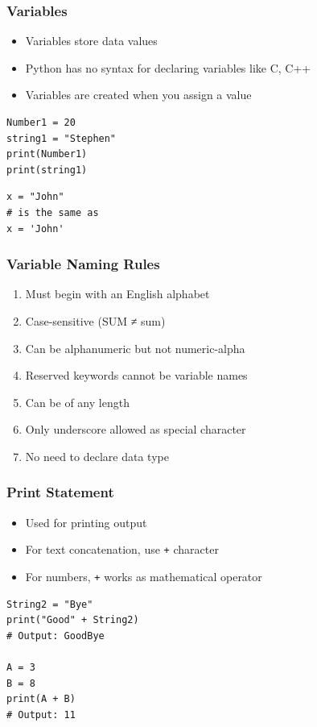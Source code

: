 \documentclass[aspectratio=169]{beamer}
\begin{document}
\begin{frame}[fragile]
\frametitle{Variables}
\begin{itemize}
\item Variables store data values
\item Python has no syntax for declaring variables like C, C++
\item Variables are created when you assign a value
\end{itemize}

\begin{lstlisting}
Number1 = 20
string1 = "Stephen"
print(Number1)
print(string1)
\end{lstlisting}

\begin{lstlisting}
x = "John"
# is the same as
x = 'John'
\end{lstlisting}
\end{frame}

\begin{frame}
\frametitle{Variable Naming Rules}
\begin{enumerate}
\item Must begin with an English alphabet
\item Case-sensitive (SUM ≠ sum)
\item Can be alphanumeric but not numeric-alpha
\item Reserved keywords cannot be variable names
\item Can be of any length
\item Only underscore allowed as special character
\item No need to declare data type
\end{enumerate}
\end{frame}

\begin{frame}[fragile]
\frametitle{Print Statement}
\begin{itemize}
\item Used for printing output
\item For text concatenation, use \texttt{+} character
\item For numbers, \texttt{+} works as mathematical operator
\end{itemize}

\begin{lstlisting}
String2 = "Bye"
print("Good" + String2)
# Output: GoodBye

A = 3
B = 8
print(A + B)
# Output: 11
\end{lstlisting}
\end{frame}
\end{document}
